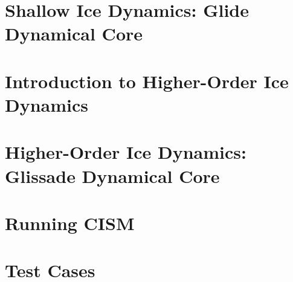 \chapter{Shallow Ice Dynamics: Glide Dynamical Core}
\renewcommand{\dir}{shallow-ice}


\chapter{Introduction to Higher-Order Ice Dynamics}
\renewcommand{\dir}{higher-order}


\chapter{Higher-Order Ice Dynamics: Glissade Dynamical Core}
\renewcommand{\dir}{glissade}


%

\chapter{Running CISM}
\renewcommand{\dir}{run_cism}


\chapter{Test Cases}
\label{chp:testcases}
\renewcommand{\dir}{tests}




%


